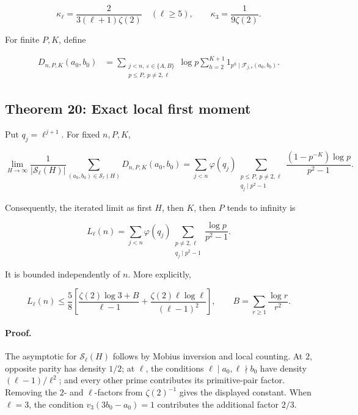 \documentclass[11pt]{article}
\begin{document}
\[
\kappa_\ell
=
\frac{2}{3(\ell+1)\zeta(2)}
\quad(\ell\geq5),
\qquad
\kappa_3
=
\frac1{9\zeta(2)}.
\]

For finite \(P,K\), define

\[
\begin{aligned}
D_{n,P,K}(a_0,b_0)
&=
\sum_{\substack{j<n,\ \varepsilon\in\{A,B\}\\
                 p\leq P,\ p\ne2,\ell}}
\log p
\sum_{h=2}^{K+1}
1_{
p^h\mid\mathcal F_{j,\varepsilon}(a_0,b_0)
}.
\end{aligned}
\]

\subsection{Theorem 20: Exact local first moment}

Put \(q_j=\ell^{j+1}\). For fixed \(n,P,K\),

\[
\boxed{
\lim_{H\to\infty}
\frac1{|\mathcal S_\ell(H)|}
\sum_{(a_0,b_0)\in\mathcal S_\ell(H)}
D_{n,P,K}(a_0,b_0)
=
\sum_{j<n}\varphi(q_j)
\sum_{\substack{p\leq P,\ p\ne2,\ell\\
                 q_j\mid p^2-1}}
\frac{(1-p^{-K})\log p}{p^2-1}.
}
\]

Consequently, the iterated limit as first \(H\), then \(K\), then \(P\)
tends to infinity is

\[
L_\ell(n)
=
\sum_{j<n}\varphi(q_j)
\sum_{\substack{p\ne2,\ell\\q_j\mid p^2-1}}
\frac{\log p}{p^2-1}.
\]

It is bounded independently of \(n\). More explicitly,

\[
L_\ell(n)
\leq
\frac58
\left[
\frac{\zeta(2)\log3+B}{\ell-1}
+
\frac{\zeta(2)\ell\log\ell}{(\ell-1)^2}
\right],
\qquad
B=\sum_{r\geq1}\frac{\log r}{r^2}.
\]

\paragraph{Proof.}

The asymptotic for \(\mathcal S_\ell(H)\) follows by Mobius inversion
and local counting. At \(2\), opposite parity has density \(1/2\); at
\(\ell\), the conditions \(\ell\mid a_0,\ell\nmid b_0\) have density
\((\ell-1)/\ell^2\); and every other prime contributes its primitive-pair
factor. Removing the \(2\)- and \(\ell\)-factors from
\(\zeta(2)^{-1}\) gives the displayed constant. When \(\ell=3\), the
condition \(v_3(3b_0-a_0)=1\) contributes the additional factor \(2/3\).
\end{document}
